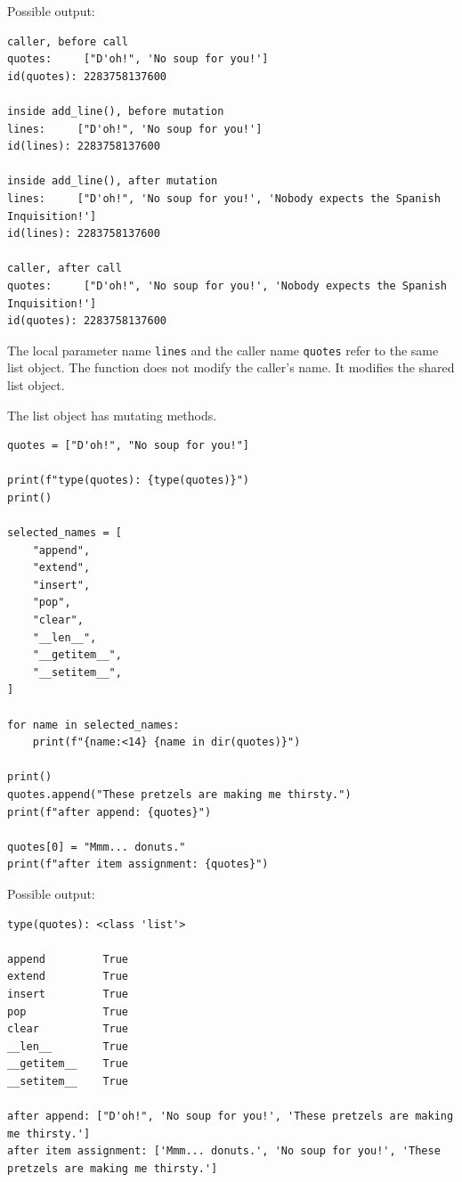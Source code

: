 Possible output:

\begin{verbatim}
caller, before call
quotes:     ["D'oh!", 'No soup for you!']
id(quotes): 2283758137600

inside add_line(), before mutation
lines:     ["D'oh!", 'No soup for you!']
id(lines): 2283758137600

inside add_line(), after mutation
lines:     ["D'oh!", 'No soup for you!', 'Nobody expects the Spanish Inquisition!']
id(lines): 2283758137600

caller, after call
quotes:     ["D'oh!", 'No soup for you!', 'Nobody expects the Spanish Inquisition!']
id(quotes): 2283758137600
\end{verbatim}

The local parameter name \texttt{lines} and the caller name \texttt{quotes} refer to the same list object. The function does not modify the caller's name. It modifies the shared list object.

The list object has mutating methods.

\begin{verbatim}
quotes = ["D'oh!", "No soup for you!"]

print(f"type(quotes): {type(quotes)}")
print()

selected_names = [
    "append",
    "extend",
    "insert",
    "pop",
    "clear",
    "__len__",
    "__getitem__",
    "__setitem__",
]

for name in selected_names:
    print(f"{name:<14} {name in dir(quotes)}")

print()
quotes.append("These pretzels are making me thirsty.")
print(f"after append: {quotes}")

quotes[0] = "Mmm... donuts."
print(f"after item assignment: {quotes}")
\end{verbatim}

Possible output:

\begin{verbatim}
type(quotes): <class 'list'>

append         True
extend         True
insert         True
pop            True
clear          True
__len__        True
__getitem__    True
__setitem__    True

after append: ["D'oh!", 'No soup for you!', 'These pretzels are making me thirsty.']
after item assignment: ['Mmm... donuts.', 'No soup for you!', 'These pretzels are making me thirsty.']
\end{verbatim}

